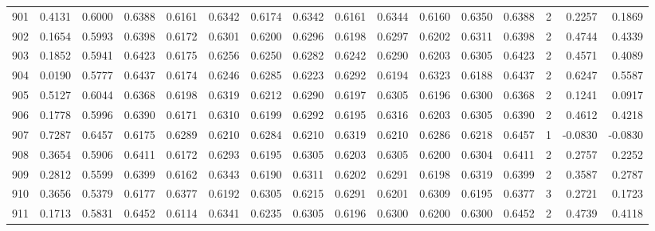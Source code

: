 \begin{tabular}{lrrrrrrrrrrrrrrr}
901 &      0.4131 &  0.6000 &  0.6388 &  0.6161 &  0.6342 &  0.6174 &  0.6342 &  0.6161 &  0.6344 &  0.6160 &   0.6350 &     0.6388 &      2 &                    0.2257 &                     0.1869 \\
902 &      0.1654 &  0.5993 &  0.6398 &  0.6172 &  0.6301 &  0.6200 &  0.6296 &  0.6198 &  0.6297 &  0.6202 &   0.6311 &     0.6398 &      2 &                    0.4744 &                     0.4339 \\
903 &      0.1852 &  0.5941 &  0.6423 &  0.6175 &  0.6256 &  0.6250 &  0.6282 &  0.6242 &  0.6290 &  0.6203 &   0.6305 &     0.6423 &      2 &                    0.4571 &                     0.4089 \\
904 &      0.0190 &  0.5777 &  0.6437 &  0.6174 &  0.6246 &  0.6285 &  0.6223 &  0.6292 &  0.6194 &  0.6323 &   0.6188 &     0.6437 &      2 &                    0.6247 &                     0.5587 \\
905 &      0.5127 &  0.6044 &  0.6368 &  0.6198 &  0.6319 &  0.6212 &  0.6290 &  0.6197 &  0.6305 &  0.6196 &   0.6300 &     0.6368 &      2 &                    0.1241 &                     0.0917 \\
906 &      0.1778 &  0.5996 &  0.6390 &  0.6171 &  0.6310 &  0.6199 &  0.6292 &  0.6195 &  0.6316 &  0.6203 &   0.6305 &     0.6390 &      2 &                    0.4612 &                     0.4218 \\
907 &      0.7287 &  0.6457 &  0.6175 &  0.6289 &  0.6210 &  0.6284 &  0.6210 &  0.6319 &  0.6210 &  0.6286 &   0.6218 &     0.6457 &      1 &                   -0.0830 &                    -0.0830 \\
908 &      0.3654 &  0.5906 &  0.6411 &  0.6172 &  0.6293 &  0.6195 &  0.6305 &  0.6203 &  0.6305 &  0.6200 &   0.6304 &     0.6411 &      2 &                    0.2757 &                     0.2252 \\
909 &      0.2812 &  0.5599 &  0.6399 &  0.6162 &  0.6343 &  0.6190 &  0.6311 &  0.6202 &  0.6291 &  0.6198 &   0.6319 &     0.6399 &      2 &                    0.3587 &                     0.2787 \\
910 &      0.3656 &  0.5379 &  0.6177 &  0.6377 &  0.6192 &  0.6305 &  0.6215 &  0.6291 &  0.6201 &  0.6309 &   0.6195 &     0.6377 &      3 &                    0.2721 &                     0.1723 \\
911 &      0.1713 &  0.5831 &  0.6452 &  0.6114 &  0.6341 &  0.6235 &  0.6305 &  0.6196 &  0.6300 &  0.6200 &   0.6300 &     0.6452 &      2 &                    0.4739 &                     0.4118 \\

\end{tabular}

